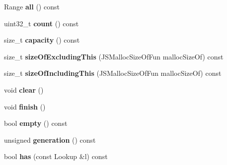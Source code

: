 \begin{DoxyCompactItemize}
\item 
\hypertarget{classjs_1_1_hash_map_a462b08d70dcc71fd2ca2a71a2c52a3c6}{Range {\bfseries all} () const }\label{classjs_1_1_hash_map_a462b08d70dcc71fd2ca2a71a2c52a3c6}

\item 
\hypertarget{classjs_1_1_hash_map_af1575eddd562fee8ca262cc4c63de7f6}{uint32\-\_\-t {\bfseries count} () const }\label{classjs_1_1_hash_map_af1575eddd562fee8ca262cc4c63de7f6}

\item 
\hypertarget{classjs_1_1_hash_map_aad1b5e2bfe1cf3eb000925a9f1cf89d0}{size\-\_\-t {\bfseries capacity} () const }\label{classjs_1_1_hash_map_aad1b5e2bfe1cf3eb000925a9f1cf89d0}

\item 
\hypertarget{classjs_1_1_hash_map_a190dc49d975aa9b7c9417c81e42ef86e}{size\-\_\-t {\bfseries size\-Of\-Excluding\-This} (J\-S\-Malloc\-Size\-Of\-Fun malloc\-Size\-Of) const }\label{classjs_1_1_hash_map_a190dc49d975aa9b7c9417c81e42ef86e}

\item 
\hypertarget{classjs_1_1_hash_map_abc8049b8510a04bb7d08a6a0110a61dc}{size\-\_\-t {\bfseries size\-Of\-Including\-This} (J\-S\-Malloc\-Size\-Of\-Fun malloc\-Size\-Of) const }\label{classjs_1_1_hash_map_abc8049b8510a04bb7d08a6a0110a61dc}

\item 
\hypertarget{classjs_1_1_hash_map_a14ca342813a52b4d1e9e49fd179418d5}{void {\bfseries clear} ()}\label{classjs_1_1_hash_map_a14ca342813a52b4d1e9e49fd179418d5}

\item 
\hypertarget{classjs_1_1_hash_map_a6188d758998c5666f3ef80f91a990f4c}{void {\bfseries finish} ()}\label{classjs_1_1_hash_map_a6188d758998c5666f3ef80f91a990f4c}

\item 
\hypertarget{classjs_1_1_hash_map_a3de2c4d11b6eec864257ef16b77de62c}{bool {\bfseries empty} () const }\label{classjs_1_1_hash_map_a3de2c4d11b6eec864257ef16b77de62c}

\item 
\hypertarget{classjs_1_1_hash_map_a203090158975f7a6dcab359be8789fed}{unsigned {\bfseries generation} () const }\label{classjs_1_1_hash_map_a203090158975f7a6dcab359be8789fed}

\item 
\hypertarget{classjs_1_1_hash_map_a4ff791e94be3dd0711fccfca3cab7bb5}{bool {\bfseries has} (const Lookup \&l) const }\label{classjs_1_1_hash_map_a4ff791e94be3dd0711fccfca3cab7bb5}


\end{DoxyCompactItemize}
